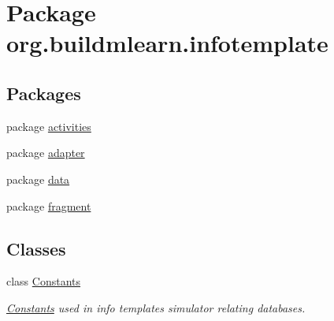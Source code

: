 \hypertarget{namespaceorg_1_1buildmlearn_1_1infotemplate}{}\section{Package org.\+buildmlearn.\+infotemplate}
\label{namespaceorg_1_1buildmlearn_1_1infotemplate}
\subsection*{Packages}
\begin{DoxyCompactItemize}
\item 
package \hyperlink{namespaceorg_1_1buildmlearn_1_1infotemplate_1_1activities}{activities}
\item 
package \hyperlink{namespaceorg_1_1buildmlearn_1_1infotemplate_1_1adapter}{adapter}
\item 
package \hyperlink{namespaceorg_1_1buildmlearn_1_1infotemplate_1_1data}{data}
\item 
package \hyperlink{namespaceorg_1_1buildmlearn_1_1infotemplate_1_1fragment}{fragment}
\end{DoxyCompactItemize}
\subsection*{Classes}
\begin{DoxyCompactItemize}
\item 
class \hyperlink{classorg_1_1buildmlearn_1_1infotemplate_1_1Constants}{Constants}
\begin{DoxyCompactList}\small\item\em \hyperlink{classorg_1_1buildmlearn_1_1infotemplate_1_1Constants}{Constants} used in info template\textquotesingle{}s simulator relating databases. \end{DoxyCompactList}\end{DoxyCompactItemize}
